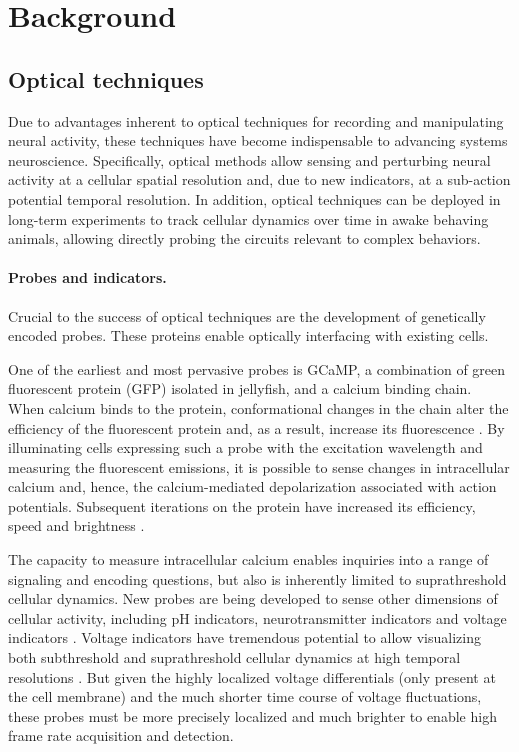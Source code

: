 \section{Background}

\subsection{Optical techniques}

Due to advantages inherent to optical techniques for 
recording and manipulating neural activity, these techniques 
have become indispensable to advancing systems neuroscience. 
Specifically, optical methods allow sensing and perturbing 
neural activity at a cellular spatial resolution and, due
to new indicators, at a sub-action potential temporal 
resolution. In addition, optical techniques can be deployed 
in long-term experiments to track cellular dynamics over time 
in awake behaving animals, allowing directly probing the 
circuits relevant to complex behaviors.

\paragraph{Probes and indicators.} Crucial to the success of 
optical techniques are the development of genetically encoded 
probes. These proteins enable optically interfacing with 
existing cells. 

One of the earliest and most pervasive probes is GCaMP, a
combination of green fluorescent protein (GFP) isolated in 
jellyfish, and a calcium binding chain. When calcium 
binds to the protein, conformational changes in the chain 
alter the efficiency of the fluorescent protein and, 
as a result, increase its fluorescence
\cite{Nakai:2001fy,Barnett:2017kn}. By illuminating cells expressing such a
probe with the excitation wavelength and measuring the 
fluorescent emissions, it is possible to sense changes in
intracellular calcium and, hence, the calcium-mediated 
depolarization associated with action potentials. Subsequent 
iterations on the protein have increased its efficiency, 
speed and brightness \cite{Chen:2013fc}.

The capacity to measure intracellular calcium enables 
inquiries into a range of signaling and encoding questions, 
but also is inherently limited to suprathreshold cellular 
dynamics. New probes are being developed to sense other 
dimensions of cellular activity, including pH indicators, 
neurotransmitter indicators and voltage indicators 
\cite{Lin:2016id}. Voltage indicators have tremendous 
potential to allow visualizing both subthreshold and 
suprathreshold cellular dynamics at high temporal resolutions 
\cite{Han:2013iz,StPierre:2014db,Gong:2015is}. But given 
the highly localized voltage differentials (only present 
at the cell membrane) and the much shorter time course of 
voltage fluctuations, these probes must be more precisely
localized and much brighter to enable high frame rate 
acquisition and detection.

